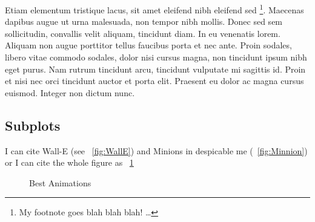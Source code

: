 Etiam elementum tristique lacus, sit amet eleifend nibh eleifend sed \footnote{My footnote goes blah blah blah! \dots}. Maecenas dapibus augue ut urna malesuada, non tempor nibh mollis. Donec sed sem sollicitudin, convallis velit aliquam, tincidunt diam. In eu venenatis lorem. Aliquam non augue porttitor tellus faucibus porta et nec ante. Proin sodales, libero vitae commodo sodales, dolor nisi cursus magna, non tincidunt ipsum nibh eget purus. Nam rutrum tincidunt arcu, tincidunt vulputate mi sagittis id. Proin et nisi nec orci tincidunt auctor et porta elit. Praesent eu dolor ac magna cursus euismod. Integer non dictum nunc.


\begin{landscape}

\section*{Subplots}
I can cite Wall-E (see ~\cref{fig:WallE}) and Minions in despicable me (~\cref{fig:Minnion}) or I can cite the whole figure as ~\cref{fig:animations}


\begin{figure}
  \centering
  \caption{Best Animations}
  \label{fig:animations}
\end{figure}


\end{landscape}
